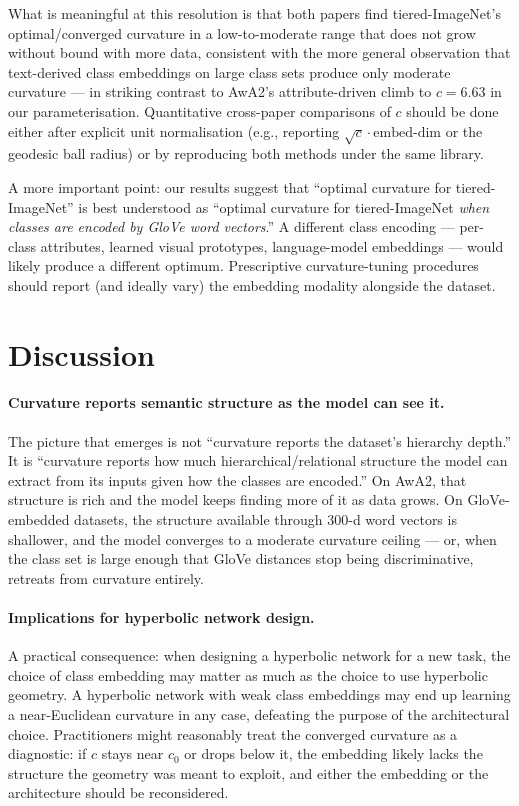 \documentclass{article}
\begin{document}
What is meaningful at this resolution is that both papers find tiered-ImageNet's optimal/converged curvature in a low-to-moderate range that does not grow without bound with more data, consistent with the more general observation that text-derived class embeddings on large class sets produce only moderate curvature --- in striking contrast to AwA2's attribute-driven climb to $c = 6.63$ in our parameterisation.
Quantitative cross-paper comparisons of $c$ should be done either after explicit unit normalisation (e.g., reporting $\sqrt{c}\cdot\text{embed-dim}$ or the geodesic ball radius) or by reproducing both methods under the same library.

A more important point: our results suggest that ``optimal curvature for tiered-ImageNet'' is best understood as ``optimal curvature for tiered-ImageNet \emph{when classes are encoded by GloVe word vectors}.''
A different class encoding --- per-class attributes, learned visual prototypes, language-model embeddings --- would likely produce a different optimum.
Prescriptive curvature-tuning procedures should report (and ideally vary) the embedding modality alongside the dataset.

\section{Discussion}\label{sec:discussion}

\paragraph{Curvature reports semantic structure as the model can see it.}
The picture that emerges is not ``curvature reports the dataset's hierarchy depth.''
It is ``curvature reports how much hierarchical/relational structure the model can extract from its inputs given how the classes are encoded.''
On AwA2, that structure is rich and the model keeps finding more of it as data grows.
On GloVe-embedded datasets, the structure available through 300-d word vectors is shallower, and the model converges to a moderate curvature ceiling --- or, when the class set is large enough that GloVe distances stop being discriminative, retreats from curvature entirely.

\paragraph{Implications for hyperbolic network design.}
A practical consequence: when designing a hyperbolic network for a new task, the choice of class embedding may matter as much as the choice to use hyperbolic geometry.
A hyperbolic network with weak class embeddings may end up learning a near-Euclidean curvature in any case, defeating the purpose of the architectural choice.
Practitioners might reasonably treat the converged curvature as a diagnostic: if $c$ stays near $c_0$ or drops below it, the embedding likely lacks the structure the geometry was meant to exploit, and either the embedding or the architecture should be reconsidered.
\end{document}

